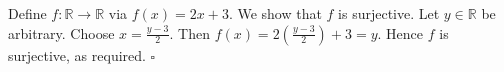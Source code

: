 Define $f : \mathbb{R} \to \mathbb{R}$ via $f(x) = 2x + 3$.
We show that $f$ is surjective.
Let $y \in \mathbb{R}$ be arbitrary.
Choose $x = \frac{y - 3}{2}$.
Then $f(x) = 2(\frac{y - 3}{2}) + 3 = y$.
Hence $f$ is surjective, as required. \hfill$\square$